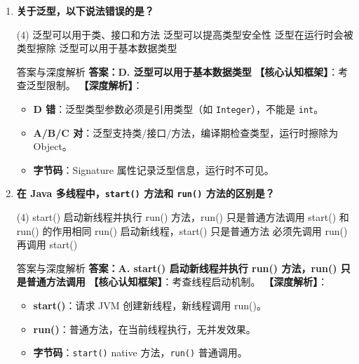 \documentclass[12pt, a4paper]{ctexart}
\newcommand{\code}[1]{\texttt{#1}}
\begin{document}
\begin{enumerate}[label=\textbf{\arabic*.}, leftmargin=*, itemsep=1.5em]
\item \textbf{关于泛型，以下说法错误的是？}
\begin{tasks}(4)
    \task 泛型可以用于类、接口和方法 \task 泛型可以提高类型安全性
    \task 泛型在运行时会被类型擦除 \task 泛型可以用于基本数据类型
\end{tasks}
\begin{bluebox}{答案与深度解析}
\textbf{答案：D. 泛型可以用于基本数据类型}
\textbf{【核心认知框架】}：考查泛型限制。
\textbf{【深度解析】}：
\begin{itemize}[leftmargin=*, nosep]
    \item \textbf{D 错}：泛型类型参数必须是引用类型（如 \code{Integer}），不能是 \code{int}。
    \item \textbf{A/B/C 对}：泛型支持类/接口/方法，编译期检查类型，运行时擦除为 Object。
    \item \textbf{字节码}：Signature 属性记录泛型信息，运行时不可见。
\end{itemize}
\end{bluebox}

\item \textbf{在 Java 多线程中，\code{start()} 方法和 \code{run()} 方法的区别是？}
\begin{tasks}(4)
    \task start() 启动新线程并执行 run() 方法，run() 只是普通方法调用
    \task start() 和 run() 的作用相同 \task run() 启动新线程，start() 只是普通方法
    \task 必须先调用 run() 再调用 start()
\end{tasks}
\begin{bluebox}{答案与深度解析}
\textbf{答案：A. start() 启动新线程并执行 run() 方法，run() 只是普通方法调用}
\textbf{【核心认知框架】}：考查线程启动机制。
\textbf{【深度解析】}：
\begin{itemize}[leftmargin=*, nosep]
    \item \textbf{start()}：请求 JVM 创建新线程，新线程调用 run()。
    \item \textbf{run()}：普通方法，在当前线程执行，无并发效果。
    \item \textbf{字节码}：\code{start()}  native 方法，\code{run()} 普通调用。
\end{itemize}
\end{bluebox}


\end{enumerate}
\end{document}
